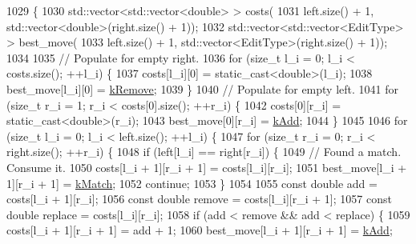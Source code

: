 \begin{DoxyCode}
1029                                                                             \{
1030   std::vector<std::vector<double> > costs(
1031       left.size() + 1, std::vector<double>(right.size() + 1));
1032   std::vector<std::vector<EditType> > best\_move(
1033       left.size() + 1, std::vector<EditType>(right.size() + 1));
1034 
1035   \textcolor{comment}{// Populate for empty right.}
1036   \textcolor{keywordflow}{for} (\textcolor{keywordtype}{size\_t} l\_i = 0; l\_i < costs.size(); ++l\_i) \{
1037     costs[l\_i][0] = \textcolor{keyword}{static\_cast<}\textcolor{keywordtype}{double}\textcolor{keyword}{>}(l\_i);
1038     best\_move[l\_i][0] = \hyperlink{namespacetesting_1_1internal_1_1edit__distance_ad46aa6da12aec1a3f166310478b53a08a814768ef6cd0264a0a10b1e701a63e78}{kRemove};
1039   \}
1040   \textcolor{comment}{// Populate for empty left.}
1041   \textcolor{keywordflow}{for} (\textcolor{keywordtype}{size\_t} r\_i = 1; r\_i < costs[0].size(); ++r\_i) \{
1042     costs[0][r\_i] = \textcolor{keyword}{static\_cast<}\textcolor{keywordtype}{double}\textcolor{keyword}{>}(r\_i);
1043     best\_move[0][r\_i] = \hyperlink{namespacetesting_1_1internal_1_1edit__distance_ad46aa6da12aec1a3f166310478b53a08a63400b073f5b311a87d568b5ae27ffe8}{kAdd};
1044   \}
1045 
1046   \textcolor{keywordflow}{for} (\textcolor{keywordtype}{size\_t} l\_i = 0; l\_i < left.size(); ++l\_i) \{
1047     \textcolor{keywordflow}{for} (\textcolor{keywordtype}{size\_t} r\_i = 0; r\_i < right.size(); ++r\_i) \{
1048       \textcolor{keywordflow}{if} (left[l\_i] == right[r\_i]) \{
1049         \textcolor{comment}{// Found a match. Consume it.}
1050         costs[l\_i + 1][r\_i + 1] = costs[l\_i][r\_i];
1051         best\_move[l\_i + 1][r\_i + 1] = \hyperlink{namespacetesting_1_1internal_1_1edit__distance_ad46aa6da12aec1a3f166310478b53a08a7bdb9c74613a94f21b7489e0b5640a63}{kMatch};
1052         \textcolor{keywordflow}{continue};
1053       \}
1054 
1055       \textcolor{keyword}{const} \textcolor{keywordtype}{double} add = costs[l\_i + 1][r\_i];
1056       \textcolor{keyword}{const} \textcolor{keywordtype}{double} \textcolor{keyword}{remove} = costs[l\_i][r\_i + 1];
1057       \textcolor{keyword}{const} \textcolor{keywordtype}{double} replace = costs[l\_i][r\_i];
1058       \textcolor{keywordflow}{if} (add < \textcolor{keyword}{remove} && add < replace) \{
1059         costs[l\_i + 1][r\_i + 1] = add + 1;
1060         best\_move[l\_i + 1][r\_i + 1] = \hyperlink{namespacetesting_1_1internal_1_1edit__distance_ad46aa6da12aec1a3f166310478b53a08a63400b073f5b311a87d568b5ae27ffe8}{kAdd};

\end{DoxyCode}

